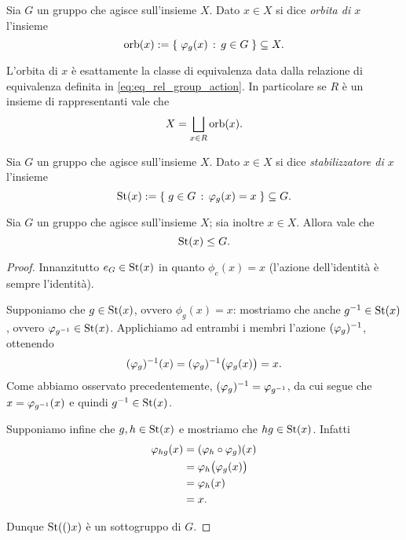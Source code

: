 \begin{definition}[Orbita]
    Sia $G$ un gruppo che agisce sull'insieme $X$. Dato $x \in X$ si dice \emph{orbita di $x$} l'insieme \[
        \orb{x} \deq \set{\phi_g(x) \suchthat g \in G} \subseteq X.    
    \]
\end{definition}

\begin{remark}
    L'orbita di $x$ è esattamente la classe di equivalenza data dalla relazione di equivalenza definita in \eqref{eq:eq_rel_group_action}. In particolare se $R$ è un insieme di rappresentanti vale che \[
        X = \bigsqcup_{x \in R} \orb{x}.    
    \]
\end{remark}

\begin{definition}[Stabilizzatore]
    Sia $G$ un gruppo che agisce sull'insieme $X$. Dato $x \in X$ si dice \emph{stabilizzatore di $x$} l'insieme \[
        \St{x} \deq \set{g \in G \suchthat \phi_g(x) = x} \subseteq G.    
    \]
\end{definition}

\begin{proposition}
    Sia $G$ un gruppo che agisce sull'insieme $X$; sia inoltre $x \in X$. Allora vale che \[
        \St{x} \sgr G.    
    \]
\end{proposition}
\begin{proof}
    Innanzitutto $e_G \in \St{x}$ in quanto $\phi_e(x) = x$ (l'azione dell'identità è sempre l'identità).

    Supponiamo che $g \in \St{x}$, ovvero $\phi_g(x) = x$: mostriamo che anche $g\inv \in \St{x}$, ovvero $\phi_{g\inv} \in \St{x}$. Applichiamo ad entrambi i membri l'azione $(\phi_g)\inv$, ottenendo \begin{align*}
        (\phi_g)\inv(x) = (\phi_g)\inv\parens[\big]{\phi_g(x)} = x.
    \end{align*} Come abbiamo osservato precedentemente, $(\phi_g)\inv = \phi_{g\inv}$, da cui segue che $x = \phi_{g\inv}(x)$ e quindi $g\inv \in \St{x}$.

    Supponiamo infine che $g, h \in \St{x}$ e mostriamo che $hg \in \St{x}$. Infatti \begin{align*}
        \phi_{hg}(x) &= (\phi_h \circ \phi_g)(x)\\
        &= \phi_h\parens[\big]{\phi_g(x)}\\
        &= \phi_h(x)\\
        &= x.
    \end{align*}

    Dunque $\St(x)$ è un sottogruppo di $G$.
\end{proof}